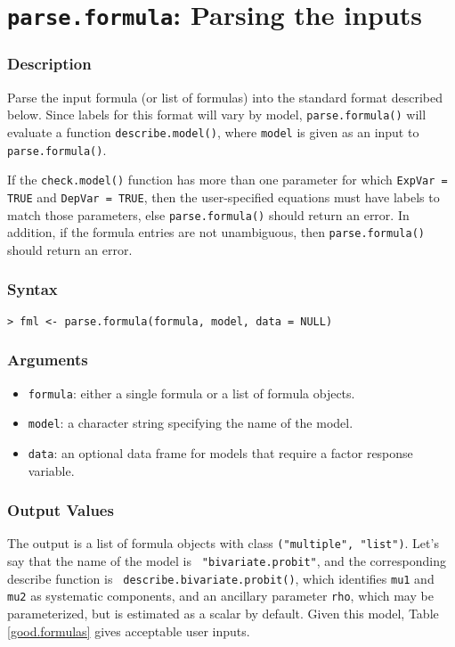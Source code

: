 \section{{\tt parse.formula}: Parsing the inputs}
\label{parse.formula}

\subsubsection{Description}
Parse the input formula (or list of formulas) into the standard format
described below.  Since labels for this format will vary by model,
{\tt parse.formula()} will evaluate a function {\tt describe.model()},
where {\tt model} is given as an input to {\tt parse.formula()}.

If the {\tt check.model()} function has more than one parameter for
which {\tt ExpVar = TRUE} and {\tt DepVar = TRUE}, then the
user-specified equations must have labels to match those parameters,
else {\tt parse.formula()} should return an error. In addition, if the
formula entries are not unambiguous, then {\tt parse.formula()} should
return an error.
  
\subsubsection{Syntax}
\begin{verbatim}
> fml <- parse.formula(formula, model, data = NULL)
\end{verbatim}

\subsubsection{Arguments}
\begin{itemize}
  \item {\tt formula}: either a single formula or a list of formula
objects.  
  \item {\tt model}: a character string specifying the name of the model.
  \item {\tt data}: an optional data frame for models that require a
factor response variable.
\end{itemize}

\subsubsection{Output Values}
The output is a list of formula objects with class {\tt ("multiple",
"list")}.  Let's say that the name of the model is {\tt
"bivariate.probit"}, and the corresponding describe function is {\tt
describe.bivariate.probit()}, which identifies {\tt mu1} and {\tt mu2}
as systematic components, and an ancillary parameter {\tt rho}, which
may be parameterized, but is estimated as a scalar by default.  Given
this model, Table \ref{good.formulas} gives acceptable user inputs.  

